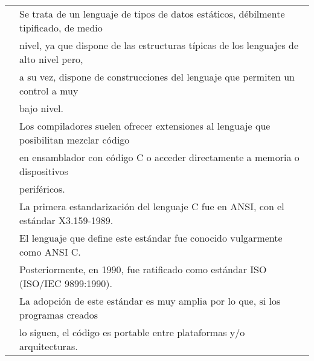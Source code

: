 \documentclass[a4paper,10pt]{article}
\begin{document}
\begin{enumerate}
\begin{tabular}{r|l}
                & Se trata de un lenguaje de tipos de datos estáticos, débilmente tipificado, de medio \\ 
                & nivel, ya que dispone de las estructuras típicas de los lenguajes de alto nivel pero, \\ 
                & a su vez, dispone de construcciones del lenguaje que permiten un control a muy \\ 
                & bajo nivel. \\ 
                & Los compiladores suelen ofrecer extensiones al lenguaje que posibilitan mezclar código\\ 
                & en ensamblador con código C o acceder directamente a memoria o dispositivos \\ 
                & periféricos. \\
        
                & La primera estandarización del lenguaje C fue en ANSI, con el estándar X3.159-1989. \\ 
                & El lenguaje que define este estándar fue conocido vulgarmente como ANSI C. \\ 
                & Posteriormente, en 1990, fue ratificado como estándar ISO (ISO/IEC 9899:1990). \\ 
                & La adopción de este estándar es muy amplia por lo que, si los programas creados \\ 
                & lo siguen, el código es portable entre plataformas y/o arquitecturas. \\
        \end{tabular}
        

\end{enumerate}
\end{document}
